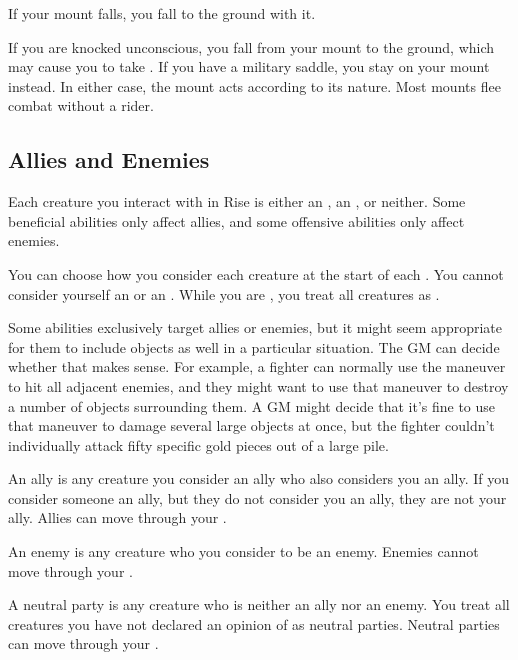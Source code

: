          If your mount falls, you fall to the ground with it.

         If you are knocked unconscious, you fall from your mount to the ground, which may cause you to take .
        If you have a military saddle, you stay on your mount instead.
        In either case, the mount acts according to its nature.
        Most mounts flee combat without a rider.

    \subsection{Allies and Enemies}\label{Allies and Enemies}
        Each creature you interact with in Rise is either an , an , or neither.
        Some beneficial abilities only affect allies, and some offensive abilities only affect enemies.

        You can choose how you consider each creature at the start of each .
        You cannot consider yourself an  or an .
        While you are \unconscious, you treat all creatures as .

        Some abilities exclusively target allies or enemies, but it might seem appropriate for them to include objects as well in a particular situation.
        The GM can decide whether that makes sense.
        For example, a fighter can normally use the  maneuver to hit all adjacent enemies, and they might want to use that maneuver to destroy a number of objects surrounding them.
        A GM might decide that it's fine to use that maneuver to damage several large objects at once, but the fighter couldn't individually attack fifty specific gold pieces out of a large pile.

         An ally is any creature you consider an ally who also considers you an ally.
        If you consider someone an ally, but they do not consider you an ally, they are not your ally.
        Allies can move through your .

         An enemy is any creature who you consider to be an enemy.
        Enemies cannot move through your .

         A neutral party is any creature who is neither an ally nor an enemy.
        You treat all creatures you have not declared an opinion of as neutral parties.
        Neutral parties can move through your .
